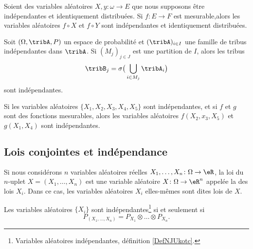 \begin{lemma}       \label{LEMooWBAZooLVVRjO}
    Soient des variables aléatoires \( X,y\colon \omega\to E\) que nous supposons être indépendantes et identiquement distribuées. Si \( f\colon E\to F\) est mesurable,alors les variables aléatoires \( f\circ X\) et \( f\circ Y\) sont indépendantes et identiquement distribuées.
\end{lemma}

\begin{lemma}  \label{LemHOjqqw}
	Soit \( (\Omega,\tribA,P)\) un espace de probabilité et \( (\tribA)_{i\in I}\) une famille de tribus indépendantes dans \( \tribA\). Si \( (M_j)_{j\in J}\) est une partition de \( I\), alors les tribus
	\begin{equation}
		\tribB_j=\sigma\big( \bigcup_{i\in M_j}\tribA_i \big)
	\end{equation}
	sont indépendantes.

	Si les variables aléatoires \( \{ X_1,X_2,X_3,X_4,X_5 \}\) sont indépendantes, et si \( f\) et \( g\) sont des fonctions mesurables, alors les variables aléatoires \( f(X_2,x_3,X_5)\) et \( g(X_1,X_4)\) sont indépendantes.
\end{lemma}

\subsection{Lois conjointes et indépendance}

\begin{definition}
    Si nous considérons \( n\) variables aléatoires réelles \( X_1,\ldots,X_n\colon\Omega\to\eR\), la loi du \( n\)-uplet \( X=(X_1,\ldots,X_n)\) est une variable aléatoire \( X\colon \Omega\to \eR^n\) appelée la  des lois \( X_i\). Dans ce cas, les variables aléatoires \( X_i\) elles-mêmes sont dites lois  de \( X\).
\end{definition}

\begin{proposition}     \label{PropPXXXPXPXPX}
    Les variables aléatoires \( \{ X_i \}\) sont indépendantes\footnote{Variables aléatoires indépendantes, définition \ref{DefNJUkotc}.} si et seulement si
	\begin{equation}
		P_{(X_1,\ldots,X_n)}=P_{X_1}\otimes\ldots\otimes P_{X_n}.
	\end{equation}
\end{proposition}

